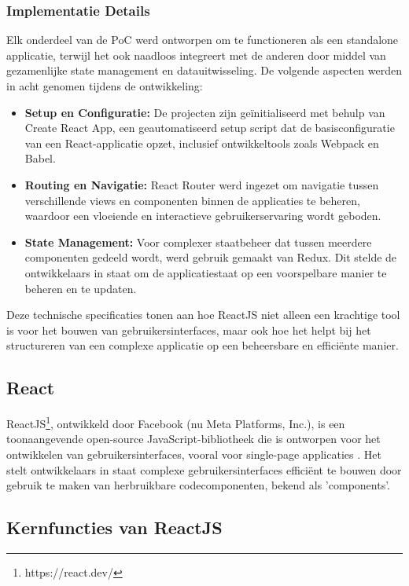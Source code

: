 \subsubsection{Implementatie Details}
Elk onderdeel van de PoC werd ontworpen om te functioneren als een standalone applicatie, terwijl het ook naadloos integreert met de anderen door middel van gezamenlijke state management en datauitwisseling. De volgende aspecten werden in acht genomen tijdens de ontwikkeling:
\begin{itemize}
    \item \textbf{Setup en Configuratie:} De projecten zijn geïnitialiseerd met behulp van Create React App, een geautomatiseerd setup script dat de basisconfiguratie van een React-applicatie opzet, inclusief ontwikkeltools zoals Webpack en Babel.
    \item \textbf{Routing en Navigatie:} React Router werd ingezet om navigatie tussen verschillende views en componenten binnen de applicaties te beheren, waardoor een vloeiende en interactieve gebruikerservaring wordt geboden.
    \item \textbf{State Management:} Voor complexer staatbeheer dat tussen meerdere componenten gedeeld wordt, werd gebruik gemaakt van Redux. Dit stelde de ontwikkelaars in staat om de applicatiestaat op een voorspelbare manier te beheren en te updaten.
\end{itemize}

Deze technische specificaties tonen aan hoe ReactJS niet alleen een krachtige tool is voor het bouwen van gebruikersinterfaces, maar ook hoe het helpt bij het structureren van een complexe applicatie op een beheersbare en efficiënte manier.

\subsection{React}
ReactJS\footnote{https://react.dev/}, ontwikkeld door Facebook (nu Meta Platforms, Inc.), is een toonaangevende open-source JavaScript-bibliotheek die is ontworpen voor het ontwikkelen van gebruikersinterfaces, vooral voor single-page applicaties \autocite{React2024}. Het stelt ontwikkelaars in staat complexe gebruikersinterfaces efficiënt te bouwen door gebruik te maken van herbruikbare codecomponenten, bekend als 'components'.

\subsection{Kernfuncties van ReactJS}

